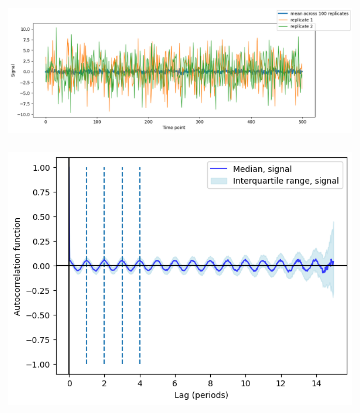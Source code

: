 \begin{figure}
  \begin{subfigure}[t]{0.6\textwidth}
  \centering
    \includegraphics[width=\linewidth]{verynoisysinusoids_outofphase}
    \caption{
    }
    \label{fig:acf-sinusoids-gausnoise-ts}
  \end{subfigure}%
  \centering
  \begin{subfigure}[t]{0.4\textwidth}
  \centering
    \includegraphics[width=\linewidth]{verynoisysinusoids_outofphase_acf}
    \caption{
    }
    \label{fig:acf-sinusoids-gausnoise-acf}
  \end{subfigure}


\end{figure}
